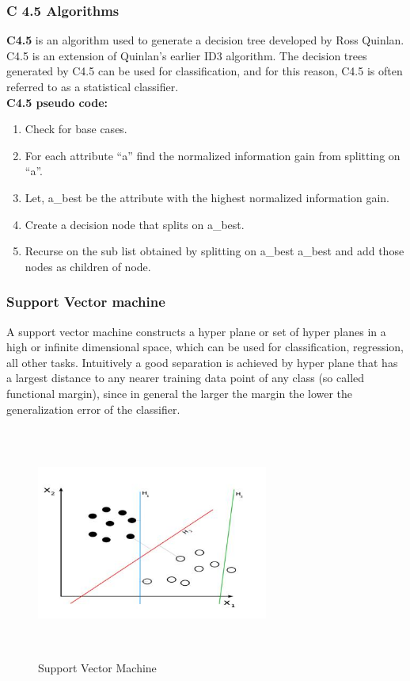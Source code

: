 \documentclass[a4paper,14pt,onecolumn]{article}
\begin{document}
\subsubsection{C 4.5 Algorithms}
\textbf{C4.5} is an algorithm used to generate a decision tree developed by Ross Quinlan. C4.5 is an extension of Quinlan's earlier ID3 algorithm. The decision trees generated by C4.5 can be used for classification, and for this reason, C4.5 is often referred to as a statistical classifier.\\
\textbf{C4.5 pseudo code:}
   \begin{enumerate}
   \item Check for base cases.
   \item For each attribute ``a'' find the normalized information gain from splitting on ``a''.
   \item Let, a\_best be the attribute with the highest normalized information gain.
   \item Create a decision node that splits on a\_best.
   \item Recurse on the sub list obtained by splitting on a\_best a\_best and add those nodes as children of node.
   \end{enumerate}

\subsubsection{Support Vector machine}
A support vector machine constructs a hyper plane or set of hyper planes in a high or infinite dimensional space, which can be used for classification, regression, all other tasks. Intuitively a good separation is achieved by hyper plane that has a largest distance to any nearer training data point of any class (so called functional margin), since in general the larger the margin the lower the generalization error of the classifier.  

\begin{figure}[h]
\begin{center}
\includegraphics[height=3in,width=3in]
{svm.jpg}  
\caption{Support Vector Machine}
\end{center}
\end{figure} 
\end{document}
